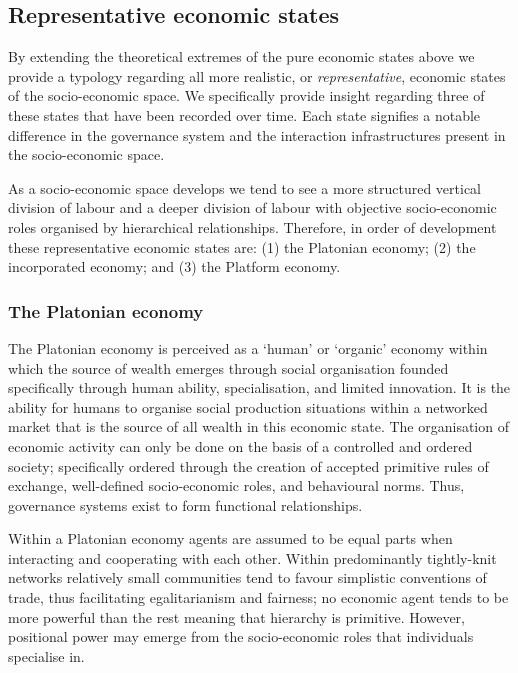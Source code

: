 \subsection{Representative economic states}

By extending the theoretical extremes of the pure economic states above we provide a typology regarding all more realistic, or \emph{representative}, economic states of the socio-economic space. We specifically provide insight regarding three of these states that have been recorded over time. Each state signifies a notable difference in the governance system and the interaction infrastructures present in the socio-economic space. 

As a socio-economic space develops we tend to see a more structured vertical division of labour and a deeper division of labour with objective socio-economic roles organised by hierarchical relationships. Therefore, in order of development these representative economic states are: (1) the Platonian economy; (2) the incorporated economy; and (3) the Platform economy.

\subsubsection{The Platonian economy}

The Platonian economy is perceived as a `human' or `organic' economy within which the source of wealth emerges through social organisation founded specifically through human ability, specialisation, and limited innovation. It is the ability for humans to organise social production situations within a networked market that is the source of all wealth in this economic state. The organisation of economic activity can only be done on the basis of a controlled and ordered society; specifically ordered through the creation of accepted primitive rules of exchange, well-defined socio-economic roles, and behavioural norms. Thus, governance systems exist to form functional relationships.

Within a Platonian economy agents are assumed to be equal parts when interacting and cooperating with each other. Within predominantly tightly-knit networks relatively small communities tend to favour simplistic conventions of trade, thus facilitating egalitarianism and fairness; no economic agent tends to be more powerful than the rest meaning that hierarchy is primitive. However, positional power may emerge from the socio-economic roles that individuals specialise in.

